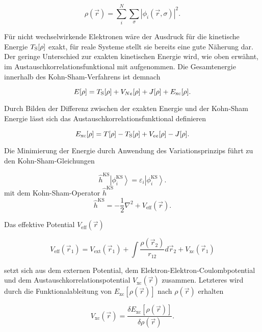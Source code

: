 \begin{equation}
\rho(\vec{r}) = \sum_i^N\sum_{\sigma}|\phi_i(\vec{r},\sigma)|^2.
\end{equation}

Für nicht wechselwirkende Elektronen wäre der Ausdruck für die kinetische Energie $T_{\textrm S}[\rho]$ exakt, für reale Systeme stellt sie bereits eine gute Näherung dar. Der geringe Unterschied zur exakten kinetischen Energie wird, wie oben erwähnt, im Austauschkorrelationsfunktional mit aufgenommen. Die Gesamtenergie innerhalb des Kohn-Sham-Verfahrens ist demnach

\begin{equation}
E[\rho] = T_{\textrm S}[\rho] + V_{Ne}[\rho]+J[\rho]+E_{\textrm{xc}}[\rho].
\end{equation}

Durch Bilden der Differenz zwischen der exakten Energie und der Kohn-Sham Energie lässt sich das Austauschkorrelationsfunktional definieren

\begin{equation}
E_{\textrm{xc}}[\rho] = T[\rho]-T_{\textrm S}[\rho]+V_{ee}[\rho]-J[\rho].
\end{equation}

Die Minimierung der Energie durch Anwendung des Variationsprinzips führt zu den Kohn-Sham-Gleichungen

\begin{equation}
\hat{h}^{\textrm{KS}}\left|\phi_i^{\textrm{KS}}\right\rangle=\varepsilon_i\left|\phi_i^{\textrm{KS}}\right\rangle.
\end{equation}
mit dem Kohn-Sham-Operator $\hat{h}^{\textrm{KS}}$
\begin{equation}
\hat{h}^{\textrm{KS}} = -\frac{1}{2}\nabla^2+V_{\textrm{eff}}(\vec{r}).
\end{equation}

Das effektive Potential $V_{\textrm{eff}}(\vec{r})$

\begin{equation}
V_{\textrm{eff}}(\vec{r}_1) = V_{\textrm{ext}}(\vec{r}_1)+\int\frac{\rho(\vec{r}_2)}{r_{12}}d\vec{r}_2 + V_{\textrm{xc}}(\vec{r}_1)
\end{equation}

setzt sich aus dem externen Potential, dem Elektron-Elektron-Coulombpotential und dem Austauschkorrelationspotential $V_{\textrm{xc}}(\vec{r})$ zusammen. Letzteres wird durch die Funktionalableitung von $E_{\textrm{xc}}[\rho(\vec{r})]$ nach $\rho(\vec{r})$ erhalten

\begin{equation}\label{funktionalableitung}
V_{\textrm{xc}}(\vec{r}) = \frac{\delta E_{\textrm{xc}}[\rho(\vec{r})]}{\delta \rho(\vec{r})}.
\end{equation}


